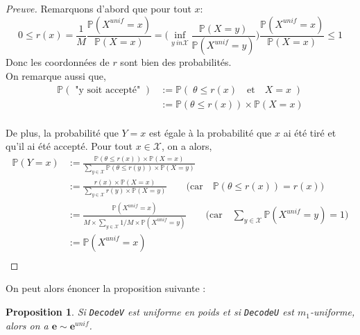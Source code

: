 \documentclass[12pt]{article}
\theoremstyle{plain}
\newtheorem{propo}[thm]{Proposition}
\theoremstyle{definition}
\begin{document}
\begin{proof}[Preuve] Remarquons d'abord que pour tout $x$:
$$0 \leq r(x) = \frac{1}{M}\frac{\mathbb{P}(X^{unif}=x)}{\mathbb{P}(X=x)} = \Bigg(\inf_{y \ in \mathcal{X}}\frac{\mathbb{P}(X=y)}{\mathbb{P}(X^{unif}=y)}\Bigg)\frac{\mathbb{P}(X^{unif}=x)}{\mathbb{P}(X=x)}\leq 1$$
Donc les coordonnées de $r$ sont bien des probabilités.\\

\noindent On remarque aussi que,
\begin{equation*}
   \begin{split}
    \mathbb{P}(\text{ "y soit accepté" }) &:= \mathbb{P}(\; \theta \leq r(x)\quad \text{et} \quad X=x\;) \\[0.6cm]
    &:=  \mathbb{P}(\theta \leq r(x)) \times\mathbb{P}(X=x) \\[0.6cm]
    \end{split}
\end{equation*}

\noindent De plus, la probabilité que $Y = x$ est égale à la probabilité que $x$ ai été tiré et qu'il ai été accepté. 
\noindent Pour tout $x \in \mathcal{X}$, on a alors,
\begin{equation*}
   \begin{split}
    \mathbb{P}(Y=x) &:= \frac{ \mathbb{P}(\theta \leq r(x)) \times\mathbb{P}(X=x)}{\sum_{y \in \mathcal{X}} \mathbb{P}(\theta \leq r(y)) \times\mathbb{P}(X=y)} \\[0.6cm]
    &:=\frac{  r(x) \times\mathbb{P}(X=x)}{\sum_{y \in \mathcal{X}}  r(y) \times\mathbb{P}(X=y)}\qquad \Big(\text{car}\quad \mathbb{P}(\theta \leq r(x)) =  r(x)\Big)\\[0.6cm]
    &:=\frac{ \mathbb{P}(X^{unif}=x)}{M\times\sum_{y \in \mathcal{X}} 1/M \times\mathbb{P}(X^{unif}=y)}\qquad \Big(\text{car}\quad \sum_{y\in \mathcal{X}}\mathbb{P}(X^{unif}=y) = 1\Big)\\[0.6cm]
    &:= \mathbb{P}(X^{unif}=x) \\[0.6cm]
    \end{split}
\end{equation*}

\end{proof}



\noindent On peut alors énoncer la proposition suivante :


\begin{propo}
Si \verb|DecodeV| est uniforme en poids et si \verb|DecodeU| est $m_1$-uniforme, alors on a $\mathbf{e}\sim\mathbf{e}^{unif}$.
\end{propo}
\end{document}
